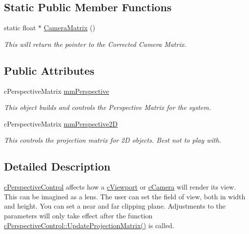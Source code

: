 \subsection*{Static Public Member Functions}
\begin{DoxyCompactItemize}
\item 
\hypertarget{classc_perspective_control_a1a7781d158a255d67d95924345f2230e}{
static float $\ast$ \hyperlink{classc_perspective_control_a1a7781d158a255d67d95924345f2230e}{CameraMatrix} ()}
\label{classc_perspective_control_a1a7781d158a255d67d95924345f2230e}

\begin{DoxyCompactList}\small\item\em This will return the pointer to the Corrected Camera Matrix. \end{DoxyCompactList}\end{DoxyCompactItemize}
\subsection*{Public Attributes}
\begin{DoxyCompactItemize}
\item 
\hypertarget{classc_perspective_control_a6386c5032f9471f652f1444070a09e03}{
cPerspectiveMatrix \hyperlink{classc_perspective_control_a6386c5032f9471f652f1444070a09e03}{mmPerspective}}
\label{classc_perspective_control_a6386c5032f9471f652f1444070a09e03}

\begin{DoxyCompactList}\small\item\em This object builds and controls the Perspective Matrix for the system. \end{DoxyCompactList}\item 
\hypertarget{classc_perspective_control_abdd9b35aa9410e08fe3608b42a7e011c}{
cPerspectiveMatrix \hyperlink{classc_perspective_control_abdd9b35aa9410e08fe3608b42a7e011c}{mmPerspective2D}}
\label{classc_perspective_control_abdd9b35aa9410e08fe3608b42a7e011c}

\begin{DoxyCompactList}\small\item\em This controls the projection matrix for 2D objects. Best not to play with. \end{DoxyCompactList}\end{DoxyCompactItemize}


\subsection{Detailed Description}
\hyperlink{classc_perspective_control}{cPerspectiveControl} affects how a \hyperlink{classc_viewport}{cViewport} or \hyperlink{classc_camera}{cCamera} will render its view. This can be imagined as a lens. The user can set the field of view, both in width and height. You can set a near and far clipping plane. Adjustments to the parameters will only take effect after the function \hyperlink{classc_perspective_control_a21f71c817289e0f250dbe9fa83f269bd}{cPerspectiveControl::UpdateProjectionMatrix()} is called. 